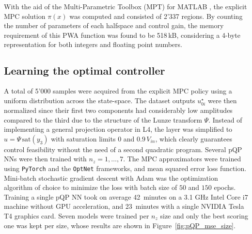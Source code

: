 With the aid of the Multi-Parametric Toolbox (MPT) for MATLAB \citep{herceg2013multi}, the explicit MPC solution $\pi(x)$ was computed and consisted of 2'337 regions. By counting the number of parameters of each halfspace and control gain, the memory requirement of this PWA function was found to be 518$\,$kB, considering a 4-byte representation for both integers and floating point numbers.


\subsection{Learning the optimal controller}

A total of 5'000 samples were acquired from the explicit MPC policy using a uniform distribution across the state-space. The dataset outputs $u_{0i}^\star$ were then normalized since their first two components had considerably low amplitudes compared to the third due to the structure of the Lunze transform $\Psi$. Instead of implementing a general projection operator in L4, the layer was simplified to $u = \Psi \, \text{sat}(y_3)$ with saturation limits $0$ and $0.9 \, V_{in}$, which clearly guarantees control feasibility without the need of a second quadratic program. Several pQP NNs were then trained with $n_z=1,\dots,7$.  The MPC approximators were trained using \texttt{PyTorch} and the \texttt{OptNet} frameworks, and mean squared error loss function. Mini-batch stochastic gradient descent with Adam \citep{kingma2014adam} was the optimization algorithm of choice to minimize the loss with batch size of $50$ and $150$ epochs. Training a single pQP NN took on average 42~minutes on a 3.1 GHz Intel Core i7 machine without GPU acceleration, and 23~minutes with a single NVIDIA Tesla T4 graphics card. Seven models were trained per $n_z$ size and only the best scoring one was kept per size, whose results are shown in Figure~\ref{fig:pQP_mse_size}.


